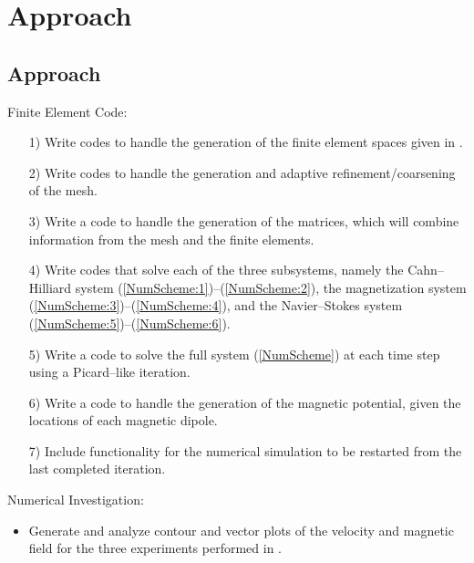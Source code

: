 \documentclass[9pt]{beamer}
\begin{document}
\section{Approach}
\begin{frame}
\section{Approach}
Finite Element Code:
\begin{itemize}
	\item[1)] Write codes to handle the generation of the finite element spaces given in \cite{DiffuseInterface}. 
	
	\item[2)] Write codes to handle the generation and adaptive refinement/coarsening of the mesh.
	
	\item[3)] Write a code to handle the generation of the matrices, which will combine information from the mesh and the finite elements. 
	
	\item[4)] Write codes that solve each of the three subsystems, namely the Cahn--Hilliard system (\ref{NumScheme:1})--(\ref{NumScheme:2}), the magnetization system (\ref{NumScheme:3})--(\ref{NumScheme:4}), and the Navier--Stokes system (\ref{NumScheme:5})--(\ref{NumScheme:6}).
	
	\item[5)] Write a code to solve the full system (\ref{NumScheme}) at each time step using a Picard--like iteration.
	
	\item[6)] Write a code to handle the generation of the magnetic potential, given the locations of each magnetic dipole.
	
	\item[7)] Include functionality for the numerical simulation to be restarted from the last completed iteration.
\end{itemize}
Numerical Investigation:
\begin{itemize}
	\item Generate and analyze contour and vector plots of the velocity and magnetic field for the three experiments performed in \cite{DiffuseInterface}.
\end{itemize}
\end{frame}
\end{document}
